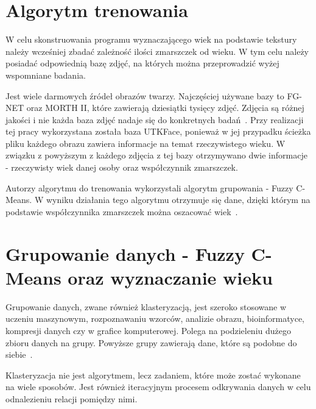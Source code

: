 \documentclass[a4paper,twoside,12pt]{book}
\begin{document}
    \section{Algorytm trenowania}\label{sec:algorytmTrenowania}
    W celu skonstruowania programu wyznaczającego wiek na podstawie tekstury należy wcześniej zbadać zależność ilości
    zmarszczek od wieku.
    W tym celu należy posiadać odpowiednią bazę zdjęć, na których można przeprowadzić wyżej wspomniane badania.

    Jest wiele darmowych źródeł obrazów twarzy.
    Najczęściej używane bazy to FG-NET oraz MORTH II, które
    zawierają dziesiątki tysięcy zdjęć.
    Zdjęcia są różnej jakości i nie każda baza zdjęć nadaje się do konkretnych badań~\cite{khryashchevGanin}.
    Przy realizacji tej pracy wykorzystana została baza UTKFace,
    ponieważ w jej przypadku ścieżka pliku każdego obrazu zawiera informacje na temat rzeczywistego wieku.
    W związku z powyższym z każdego zdjęcia z tej bazy otrzymywano dwie informacje - rzeczywisty wiek danej osoby oraz
    współczynnik zmarszczek.

    Autorzy algorytmu do trenowania wykorzystali algorytm grupowania - Fuzzy C-Means.
    W wyniku działania tego algorytmu otrzymuje się dane, dzięki którym na podstawie współczynnika zmarszczek można
    oszacować wiek~\cite{wrinkleFeatures}.
    \section{Grupowanie danych - Fuzzy C-Means oraz wyznaczanie wieku}\label{sec:grupowanieDanych}
    Grupowanie danych, zwane również klasteryzacją, jest szeroko stosowane w uczeniu maszynowym, rozpoznawaniu wzorców,
    analizie obrazu, bioinformatyce, kompresji danych czy w grafice komputerowej.
    Polega na podzieleniu dużego zbioru danych na grupy.
    Powyższe grupy zawierają dane, które są podobne do siebie~\cite{clusterWstep}.

    Klasteryzacja nie jest algorytmem, lecz zadaniem, które może zostać wykonane na wiele sposobów.
    Jest również iteracyjnym procesem odkrywania danych w celu odnalezieniu relacji pomiędzy nimi.
\end{document}
